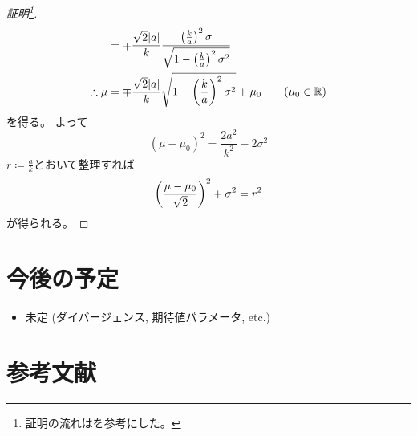 \documentclass[report]{jlreq}
\begin{document}
\begin{proof}[証明\footnote{
    証明の流れは\cite[Chap.3 14.4]{Tu17}を参考にした。
}]
\begin{alignat}{1}
            &=
                \mp \frac{\sqrt{2} |a|}{k}
                \frac{
                    \left({
                        \frac{k}{a}
                    }\right)^2
                    \sigma
                }{
                    \sqrt{
                        1 - \left({
                            \frac{k}{a}
                        }\right)^2
                        \sigma^2
                    }
                }
                \\
        \therefore \mu
            &=
                \mp \frac{\sqrt{2} |a|}{k}
                \sqrt{
                    1 - \left({
                        \frac{k}{a}
                    }\right)^2
                    \sigma^2
                }
                + \mu_0
                \qquad
                (\mu_0 \in \mathbb{R})
    \end{alignat}
    を得る。
    よって
    \begin{equation}
        (\mu - \mu_0)^2
            =
                \frac{2 a^2}{k^2}
                - 2 \sigma^2
    \end{equation}
    $r \coloneqq \frac{a}{k}$とおいて整理すれば
    \begin{equation}
        \left({
            \frac{\mu - \mu_0}{\sqrt{2}}
        }\right)^2
            + \sigma^2
            = r^2
    \end{equation}
    が得られる。
\end{proof}


%
\section*{今後の予定}

\begin{itemize}
    \item 未定 (ダイバージェンス, 期待値パラメータ, etc.)
\end{itemize}

%
\section*{参考文献}

\nocite{amari_information_2016}

{
    \renewcommand{\bibsection}{}
    
    
}
\end{document}

